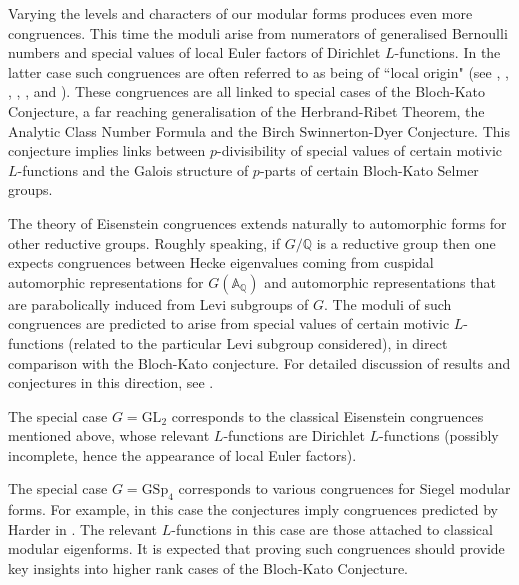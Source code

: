 \documentclass[a4paper,oneside]{amsart}
\theoremstyle{plain}
\theoremstyle{definition}
\begin{document}
Varying the levels and characters of our modular forms produces even more congruences. This time the moduli arise from numerators of generalised Bernoulli numbers and special values of local Euler factors of Dirichlet $L$-functions. In the latter case such congruences are often referred to as being of ``local origin" (see \cite{mazur}, \cite{dummigan}, \cite{dummiganfretwell}, \cite{billereymenares}, \cite{billereymenares2}, \cite{spencer} and \cite{fretwellroberts}). These congruences are all linked to special cases of the Bloch-Kato Conjecture, a far reaching generalisation of the Herbrand-Ribet Theorem, the Analytic Class Number Formula and the Birch Swinnerton-Dyer Conjecture. This conjecture implies links between $p$-divisibility of special values of certain motivic $L$-functions and the Galois structure of $p$-parts of certain Bloch-Kato Selmer groups.

The theory of Eisenstein congruences extends naturally to automorphic forms for other reductive groups. Roughly speaking, if $G/\mathbb{Q}$ is a reductive group then one expects congruences between Hecke eigenvalues coming from cuspidal automorphic representations for $G(\mathbb{A}_{\mathbb{Q}})$ and automorphic representations that are parabolically induced from Levi subgroups of $G$. The moduli of such congruences are predicted to arise from special values of certain motivic $L$-functions (related to the particular Levi subgroup considered), in direct comparison with the Bloch-Kato conjecture. For detailed discussion of results and conjectures in this direction, see \cite{bergstromdummigan}. 

The special case $G = \text{GL}_2$ corresponds to the classical Eisenstein congruences mentioned above, whose relevant $L$-functions are Dirichlet $L$-functions (possibly incomplete, hence the appearance of local Euler factors). 

The special case $G = \text{GSp}_4$ corresponds to various congruences for Siegel modular forms. For example, in this case the conjectures imply congruences predicted by Harder in \cite{harder}. The relevant $L$-functions in this case are those attached to classical modular eigenforms. It is expected that proving such congruences should provide key insights into higher rank cases of the Bloch-Kato Conjecture.
\end{document}
